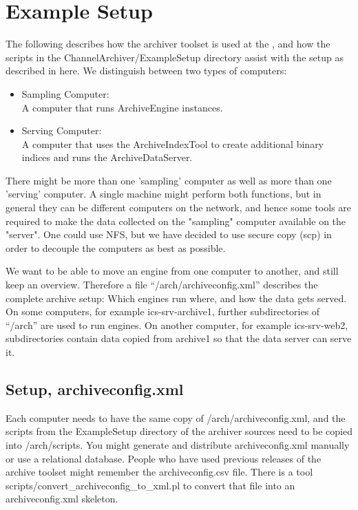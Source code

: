 \chapter{Example Setup} \label{ch:examplesetup}
The following describes how the archiver toolset is used at the
, and how the scripts in
the ChannelArchiver/ExampleSetup directory assist with the
setup as described in here.
We distinguish between two types of computers:
\begin{itemize}
\item Sampling Computer:\\
      A computer that runs ArchiveEngine instances.
\item Serving Computer:\\
      A computer that uses the ArchiveIndexTool to create
      additional binary indices and runs the ArchiveDataServer.
\end{itemize}

\noindent There might be more than one 'sampling' computer as well as more
than one 'serving' computer.  A single machine might perform both
functions, but in general they can be different computers on the
network, and hence some tools are required to make the data collected
on the "sampling" computer available on the "server".  One could use
NFS, but we have decided to use secure copy (scp) in order to decouple
the computers as best as possible.

We want to be able to move an engine from one computer to another, and
still keep an overview.  Therefore a file ``/arch/archiveconfig.xml''
describes the complete archive setup: Which engines run where, and how
the data gets served.  On some computers, for example
ics-srv-archive1, further subdirectories of ``/arch'' are used to run
engines.  On another computer, for example ics-srv-web2,
subdirectories contain data copied from archive1 so that the data
server can serve it.

\section{Setup, archiveconfig.xml}
Each computer needs to have the same copy of /arch/archiveconfig.xml,
and the scripts from the ExampleSetup directory of the archiver
sources need to be copied into /arch/scripts.
You might generate and distribute archiveconfig.xml manually or use a
relational database.  People who have used previous releases of the
archive toolset might remember the archiveconfig.csv file. There is a
tool scripts/convert\_archiveconfig\_to\_xml.pl to convert that file into an
archiveconfig.xml skeleton.

